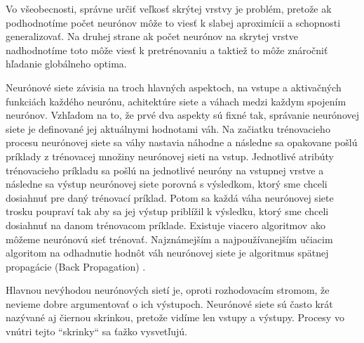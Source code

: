 Vo všeobecnosti, správne určiť veľkosť skrýtej vrstvy je problém, pretože ak podhodnotíme počet neurónov môže to viesť k slabej aproximícii a schopnosti generalizovať. Na druhej strane ak počet neurónov na skrytej vrstve nadhodnotíme toto môže viesť k pretrénovaniu a taktiež to môže znáročniť hľadanie globálneho optima.\par
Neurónové siete závisia na troch hlavných aspektoch, na vstupe a aktivačných funkciách každého neurónu, achitektúre siete a váhach medzi každym spojením neurónov. Vzhľadom na to, že prvé dva aspekty sú fixné tak, správanie neurónovej siete je definované jej aktuálnymi hodnotami váh. Na začiatku trénovacieho procesu neurónovej siete sa váhy nastavia náhodne a následne sa opakovane pošlú príklady z trénovacej množiny neurónovej sieti na vstup. Jednotlivé atribúty trénovacieho príkladu sa pošlú na jednotlivé neuróny na vstupnej vrstve a následne sa výstup neurónovej siete porovná s výsledkom, ktorý sme chceli dosiahnuť pre daný trénovací príklad. Potom sa každá váha neurónovej siete trosku poupraví tak aby sa jej výstup priblížil k výsledku, ktorý sme chceli dosiahnuť na danom trénovacom príklade. Existuje viacero algoritmov ako môžeme neurónovú sieť trénovať\cite{nn_training}. Najznámejším a najpoužívanejším učiacim algoritom na odhadnutie hodnôt váh neurónovej siete je algoritmus spätnej propagácie (Back Propagation) \cite{backprop}.\par
Hlavnou nevýhodou neurónových sietí je, oproti rozhodovacím stromom, že nevieme dobre argumentovať o ich výstupoch. Neurónové siete sú často krát nazývané aj čiernou skrinkou, pretože vidíme len vstupy a výstupy. Procesy vo vnútri tejto ``skrinky`` sa ťažko vysvetľujú.
